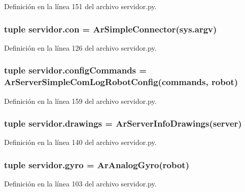 Definición en la línea 151 del archivo servidor.py.

\hypertarget{namespaceservidor_ae78d17158a0f45369b3621468e736bf6}{
\subsubsection[{con}]{\setlength{\rightskip}{0pt plus 5cm}tuple {\bf servidor.con} = ArSimpleConnector(sys.argv)}}
\label{namespaceservidor_ae78d17158a0f45369b3621468e736bf6}


Definición en la línea 126 del archivo servidor.py.

\hypertarget{namespaceservidor_aa210848229916c300b66b7f7958baa24}{
\subsubsection[{configCommands}]{\setlength{\rightskip}{0pt plus 5cm}tuple {\bf servidor.configCommands} = ArServerSimpleComLogRobotConfig({\bf commands}, {\bf robot})}}
\label{namespaceservidor_aa210848229916c300b66b7f7958baa24}


Definición en la línea 159 del archivo servidor.py.

\hypertarget{namespaceservidor_a691fe74e57a668507d56d3acd8e19ba2}{
\subsubsection[{drawings}]{\setlength{\rightskip}{0pt plus 5cm}tuple {\bf servidor.drawings} = ArServerInfoDrawings({\bf server})}}
\label{namespaceservidor_a691fe74e57a668507d56d3acd8e19ba2}


Definición en la línea 140 del archivo servidor.py.

\hypertarget{namespaceservidor_a73a7e14af1c6774da1d3c5580e02573c}{
\subsubsection[{gyro}]{\setlength{\rightskip}{0pt plus 5cm}tuple {\bf servidor.gyro} = ArAnalogGyro({\bf robot})}}
\label{namespaceservidor_a73a7e14af1c6774da1d3c5580e02573c}


Definición en la línea 103 del archivo servidor.py.

